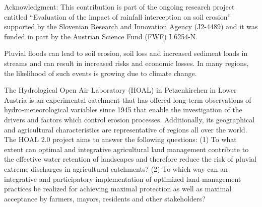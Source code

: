 Acknowledgment: This contribution is part of the ongoing research project entitled “Evaluation of the impact of rainfall interception on soil erosion” supported by the Slovenian Research and Innovation Agency (J2-4489) and it was funded in part by the Austrian Science Fund (FWF) I 6254-N.
\newpage{}
{}
\begin{flushleft}






\end{flushleft}

\noindent

Pluvial floods can lead to soil erosion, soil loss and increased sediment loads in streams and can result in increased risks and economic losses. In many regions, the likelihood of such events is growing due to climate change.

The Hydrological Open Air Laboratory (HOAL) in Petzenkirchen in Lower Austria is an experimental catchment that has offered long-term observations of hydro-meteorological variables since 1945 that enable the investigation of the drivers and factors which control erosion processes. Additionally, its geographical and agricultural characteristics are representative of regions all over the world. The HOAL 2.0 project aims to answer the following questions: (1) To what extent can optimal and integrative agricultural land management contribute to the effective water retention of landscapes and therefore reduce the risk of pluvial extreme discharges in agricultural catchments? (2) To which way can an integrative and participatory implementation of optimized land-management practices be realized for achieving maximal protection as well as maximal acceptance by farmers, mayors, residents and other stakeholders?

